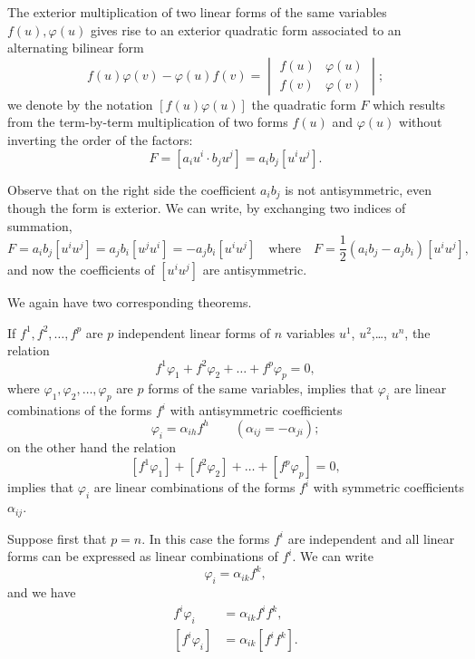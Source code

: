 \vspace{12pt}\fsec The exterior multiplication of two linear forms of the same variables $f(u), \varphi(u)$ gives rise to an exterior quadratic form associated to an alternating bilinear form
\[
f(u)\varphi(v)-\varphi(u)f(v)=
\begin{vmatrix}
  f(u)&\varphi(u)\\
  f(v)&\varphi(v)
\end{vmatrix}
;
\]
we denote by the notation $[f(u)\varphi(u)]$ the quadratic form $F$ which results from the term-by-term multiplication of two forms $f(u)$ and $\varphi(u)$ without inverting the order of the factors:
\begin{equation}
  \label{eq:4}
  F=[a_{i}u^{i}\cdot b_{j}u^{j}]=a_{i}b_{j}[u^{i}u^{j}].
\end{equation}

Observe that on the right side the coefficient $a_{i}b_{j}$ is not antisymmetric, even though the form is exterior. We can write, by exchanging two indices of summation,
\begin{equation}
  \label{eq:5}
  F=a_{i}b_{j}[u^{i}u^{j}]=a_{j}b_{i}[u^{j}u^{i}]=-a_{j}b_{i}[u^{i}u^{j}]\quad\text{where}\quad F=\frac{1}{2}(a_{i}b_{j}-a_{j}b_{i})[u^{i}u^{j}],
\end{equation}
and now the coefficients of $[u^{i}u^{j}]$ are antisymmetric.

We again have two corresponding theorems.
\begin{thm*}
  If $f^{1}, f^{2},\dots,f^{p}$ are $p$ independent linear forms of $n$ variables $u^{1}$, $u^{2}$,\dots, $u^{n}$, the relation
\[
f^{1}\varphi_{1}+f^{2}\varphi_{2}+\dots+f^{p}\varphi_{p}=0,
\]
where $\varphi_{1},\varphi_{2},\dots,\varphi_{p}$ are $p$ forms of the same variables, implies that  $\varphi_{i}$ are  linear combinations of the forms $f^{i}$ with antisymmetric coefficients
\[
\varphi_{i}=\alpha_{ih}f^{h}\qquad(\alpha_{ij}=-\alpha_{ji});
\]
on the other hand the relation
\[
[f^{1}\varphi_{1}]+[f^{2}\varphi_{2}]+\dots+[f^{p}\varphi_{p}]=0,
\]
implies that  $\varphi_{i}$ are  linear combinations of the forms $f^{i}$ with symmetric coefficients $\alpha_{ij}$.
\end{thm*}

Suppose first that $p=n$. In this case the forms $f^{i}$ are independent and all linear forms can be expressed as linear combinations of $f^{i}$. We can write
\[
\varphi_{i}=\alpha_{ik}f^{k},
\]
and we have
\begin{align*}
  f^{i}\varphi_{i}&=\alpha_{ik}f^{i}f^{k},\\
  [f^{i}\varphi_{i}]&=\alpha_{ik}[f^{i}f^{k}].
\end{align*}

